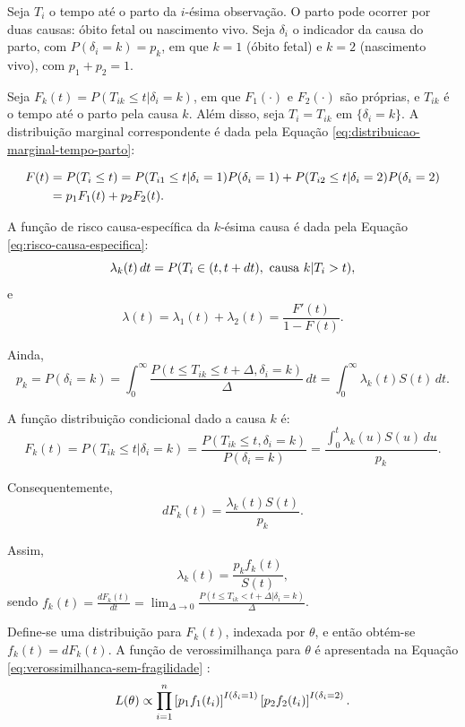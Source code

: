 Seja $T_i$ o tempo até o parto da $i$-ésima observação. O parto pode ocorrer por
duas causas: óbito fetal ou nascimento vivo. Seja $\delta_i$ o indicador da causa
do parto, com $P(\delta_i=k)=p_k$, em que $k=1$ (óbito fetal) e $k=2$
(nascimento vivo), com $p_1+p_2=1$.

Seja $F_k(t)=P(T_{ik}\leq t| \delta_i=k)$, em que $F_1(\cdot)$ e
$F_2(\cdot)$ são próprias, e $T_{ik}$ é o tempo até o parto pela causa $k$.
Além disso, seja $T_i=T_{ik}$ em $\{\delta_i=k\}$. A distribuição marginal
correspondente é dada pela Equação \ref{eq:distribuicao-marginal-tempo-parto}:

\begin{equation}
\lequation{Distribuição marginal do tempo até o parto}
\label{eq:distribuicao-marginal-tempo-parto}
\begin{aligned}
F(t)&=P(T_i\leq t)=P(T_{i1}\leq t| \delta_i=1)P(\delta_i=1)
+P(T_{i2}\leq t| \delta_i=2)P(\delta_i=2)\\
&=p_1F_1(t)+p_2F_2(t).
\end{aligned}
\end{equation}

A função de risco causa-específica da $k$-ésima causa é dada pela Equação \ref{eq:risco-causa-especifica}:
\begin{equation}
\lequation{Risco causa-específico}
\label{eq:risco-causa-especifica}
\lambda_k(t)\,dt
=P(T_i\in(t,t+dt),\text{ causa } k| T_i>t),
\end{equation}
e
\[
\lambda(t)=\lambda_1(t)+\lambda_2(t)=\frac{F'(t)}{1-F(t)}.
\]

Ainda,
\[
p_k=P(\delta_i=k)
=\int_0^\infty
\frac{P(t\leq T_{ik}\leq t+\Delta,\delta_i=k)}{\Delta}\,dt
=\int_0^\infty \lambda_k(t)S(t)\,dt.
\]

A função distribuição condicional dado a causa $k$ é:
\[
F_k(t)=P(T_{ik}\leq t| \delta_i=k)
=\frac{P(T_{ik}\leq t,\delta_i=k)}{P(\delta_i=k)}
=\frac{\int_0^t \lambda_k(u)S(u)\,du}{p_k}.
\]

Consequentemente,
\[
dF_k(t)=\frac{\lambda_k(t)S(t)}{p_k}.
\]

Assim,
\[
\lambda_k(t)=\frac{p_kf_k(t)}{S(t)},
\]
sendo $f_k(t)=\frac{dF_k(t)}{dt}
=\lim_{\Delta\to0}
\frac{P(t\leq T_{ik}<t+\Delta| \delta_i=k)}{\Delta}$.

Define-se uma distribuição para $F_k(t)$, indexada por $\theta$, e então obtém-se
$f_k(t)=dF_k(t)$. A função de verossimilhança para $\theta$ é apresentada na Equação \ref{eq:verossimilhanca-sem-fragilidade} \cite{maller2002}:
\begin{equation}
\lequation{Verossimilhança sem fragilidade compartilhada}
\label{eq:verossimilhanca-sem-fragilidade}
L(\theta)\propto
\prod_{i=1}^{n}
\left[p_1f_1(t_i)\right]^{I(\delta_i=1)}
\left[p_2f_2(t_i)\right]^{I(\delta_i=2)}.
\end{equation}

